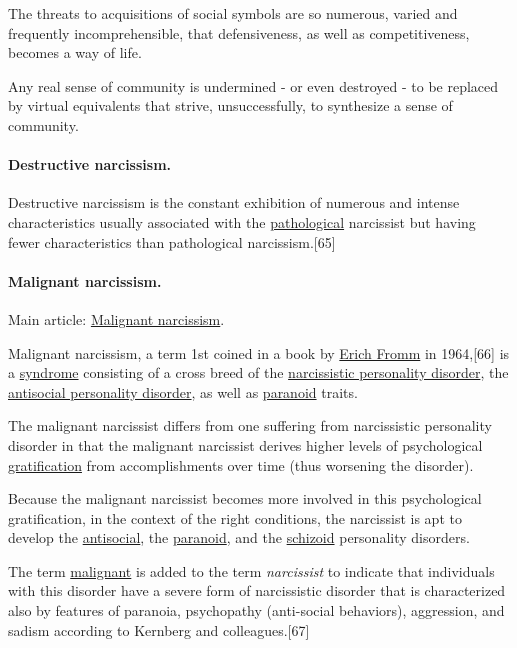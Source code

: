 \documentclass[oneside]{book}
\numberwithin{equation}{section}
\begin{document}
The threats to acquisitions of social symbols are so numerous, varied and frequently incomprehensible, that defensiveness, as well as competitiveness, becomes a way of life.

Any real sense of community is undermined - or even destroyed - to be replaced by virtual equivalents that strive, unsuccessfully, to synthesize a sense of community.

\paragraph{Destructive narcissism.} Destructive narcissism is the constant exhibition of numerous and intense characteristics usually associated with the \href{https://en.wikipedia.org/wiki/Pathological}{pathological} narcissist but having fewer characteristics than pathological narcissism.[65]

\paragraph{Malignant narcissism.} Main article: \href{https://en.wikipedia.org/wiki/Malignant_narcissism}{Malignant narcissism}.

Malignant narcissism, a term 1st coined in a book by \href{https://en.wikipedia.org/wiki/Erich_Fromm}{Erich Fromm} in 1964,[66] is a \href{https://en.wikipedia.org/wiki/Syndrome}{syndrome} consisting of a cross breed of the \href{https://en.wikipedia.org/wiki/Narcissistic_personality_disorder}{narcissistic personality disorder}, the \href{https://en.wikipedia.org/wiki/Antisocial_personality_disorder}{antisocial personality disorder}, as well as \href{https://en.wikipedia.org/wiki/Paranoia}{paranoid} traits.

The malignant narcissist differs from one suffering from narcissistic personality disorder in that the malignant narcissist derives higher levels of psychological \href{https://en.wikipedia.org/wiki/Gratification}{gratification} from accomplishments over time (thus worsening the disorder).

Because the malignant narcissist becomes more involved in this psychological gratification, in the context of the right conditions, the narcissist is apt to develop the \href{https://en.wikipedia.org/wiki/Antisocial_personality_disorder}{antisocial}, the \href{https://en.wikipedia.org/wiki/Paranoid_personality_disorder}{paranoid}, and the \href{https://en.wikipedia.org/wiki/Schizoid}{schizoid} personality disorders.

The term \href{https://en.wikipedia.org/wiki/Malignant}{malignant} is added to the term \textit{narcissist} to indicate that individuals with this disorder have a severe form of narcissistic disorder that is characterized also by features of paranoia, psychopathy (anti-social behaviors), aggression, and sadism according to Kernberg and colleagues.[67]
\end{document}
